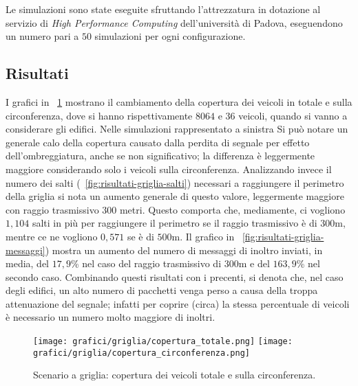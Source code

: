 Le simulazioni sono state eseguite sfruttando l'attrezzatura in dotazione al servizio di \textit{High Performance Computing} dell'università di Padova,
eseguendono un numero pari a $50$ simulazioni per ogni configurazione.
%
%
\subsection{Risultati}\label{sec:configurazione-griglia-risultati}
I grafici in \figurename~\ref{fig:risultati-griglia-copertura} mostrano il cambiamento della copertura dei veicoli in totale e sulla circonferenza,
dove si hanno rispettivamente $8064$ e $36$ veicoli, quando si vanno a considerare gli edifici.
Nelle simulazioni rappresentato a sinistra
Si può notare un generale calo della copertura causato dalla perdita di segnale per effetto dell'ombreggiatura,
anche se non significativo; la differenza è leggermente maggiore considerando solo i veicoli sulla circonferenza.
Analizzando invece il numero dei salti (\figurename~\ref{fig:risultati-griglia-salti}) necessari a raggiungere il perimetro della griglia
si nota un aumento generale di questo valore, leggermente maggiore con raggio trasmissivo $300$ metri.
Questo comporta che, mediamente, ci vogliono $1,104$ salti in più per raggiungere il perimetro se il raggio
trasmissivo è di $300$m, mentre ce ne vogliono $0,571$ se è di $500$m.
Il grafico in \figurename~\ref{fig:risultati-griglia-messaggi}) mostra un aumento del numero di messaggi
di inoltro inviati, in media, del $17,9$\% nel caso del raggio trasmissivo di $300$m
e del $163,9$\% nel secondo caso.
Combinando questi risultati con i precenti, si denota che, nel caso degli edifici,
un alto numero di pacchetti venga perso a causa della troppa attenuazione del segnale;
infatti per coprire (circa) la stessa percentuale di veicoli è necessario un numero molto maggiore di inoltri.
%
\begin{figure}[htbp]
	\centering
		\texttt{[image: grafici/griglia/copertura\_totale.png]}
		\texttt{[image: grafici/griglia/copertura\_circonferenza.png]}
\caption{Scenario a griglia: copertura dei veicoli totale e sulla circonferenza.\label{fig:risultati-griglia-copertura}}
\end{figure}
